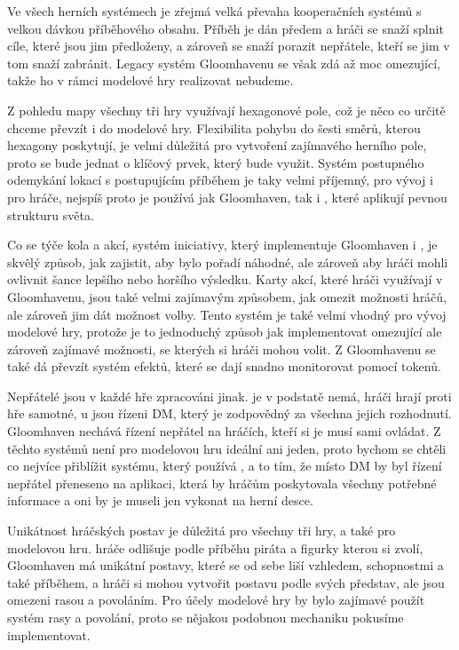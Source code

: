 Ve všech herních systémech je zřejmá velká převaha kooperačních systémů s velkou dávkou příběhového obsahu. Příběh je dán předem a hráči se snaží splnit cíle, které jsou jim předloženy, a zároveň se snaží porazit nepřátele, kteří se jim v tom snaží zabránit. Legacy systém Gloomhavenu se však zdá až moc omezující, takže ho v rámci modelové hry realizovat nebudeme.

Z pohledu mapy všechny tři hry využívají hexagonové pole, což je něco co určitě chceme převzít i do modelové hry. Flexibilita pohybu do šesti směrů, kterou hexagony poskytují, je velmi důležitá pro vytvoření zajímavého herního pole, proto se bude jednat o klíčový prvek, který bude využit. Systém postupného odemykání lokací s postupujícím příběhem je taky velmi příjemný, pro vývoj i pro hráče, nejspíš proto je používá jak Gloomhaven, tak i , které aplikují pevnou strukturu světa.

Co se týče kola a akcí, systém iniciativy, který implementuje Gloomhaven i \dnd{}, je skvělý způsob, jak zajistit, aby bylo pořadí náhodné, ale zároveň aby hráči mohli ovlivnit šance lepšího nebo horšího výsledku. Karty akcí, které hráči využívají v Gloomhavenu, jsou také velmi zajímavým způsobem, jak omezit možnosti hráčů, ale zároveň jim dát možnost volby. Tento systém je také velmi vhodný pro vývoj modelové hry, protože je to jednoduchý způsob jak implementovat omezující ale zároveň zajímavé možnosti, se kterých si hráči mohou volit. Z Gloomhavenu se také dá převzít systém efektů, které se dají snadno monitorovat pomocí tokenů.

Nepřátelé jsou v každé hře zpracováni jinak.  je v podstatě nemá, hráči hrají proti hře samotné, u \dnd{} jsou řízeni DM, který je zodpovědný za všechna jejich rozhodnutí. Gloomhaven nechává řízení nepřátel na hráčích, kteří si je musí sami ovládat. Z těchto systémů není pro modelovou hru ideální ani jeden, proto bychom se chtěli co nejvíce přiblížit systému, který používá \dnd{}, a to tím, že místo DM by byl řízení nepřátel přeneseno na aplikaci, která by hráčům poskytovala všechny potřebné informace a oni by je museli jen vykonat na herní desce.

Unikátnost hráčských postav je důležitá pro všechny tři hry, a také pro modelovou hru.  hráče odlišuje podle příběhu piráta a figurky kterou si zvolí, Gloomhaven má unikátní postavy, které se od sebe liší vzhledem, schopnostmi a také příběhem, a \dnd{} hráči si mohou vytvořit postavu podle svých představ, ale jsou omezeni rasou a povoláním. Pro účely modelové hry by bylo zajímavé použít systém rasy a povolání, proto se nějakou podobnou mechaniku pokusíme implementovat.

